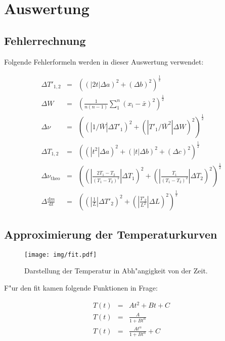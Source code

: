 \clearpage
\section{Auswertung}

\subsection{Fehlerrechnung} %
\label{sub:fehlerrechnung}

Folgende Fehlerformeln werden in dieser Auswertung verwendet:

\begin{eqnarray}
	\Delta T'_\mathrm{1,2} &=& \left((|2t| \Delta a)^2 + (\Delta b)^2\right)^\frac{1}{2}\\
	\Delta W &=& \left(\frac{1}{n(n-1)}\sum_1^n (x_\mathrm{i}-\bar{x})^2\right)^\frac{1}{2}\\
	\Delta \nu &=& \left((|1/\bar{W}| \Delta T'_\mathrm{1})^2 + (|T'_\mathrm{1}/\bar{W}^2| \Delta W)^2\right)^\frac{1}{2}\\
	\Delta T_\mathrm{1,2} &=& \left((|t^2| \Delta a)^2 + (|t| \Delta b)^2 + (\Delta c)^2\right)^\frac{1}{2}\\
	\Delta \nu_\mathrm{theo} &=& \left(\left(|\frac{2T_\mathrm{1}-T_\mathrm{2}}{(T_\mathrm{1}-T_\mathrm{2})^2}| \Delta T_\mathrm{1}\right)^2 + \left(|\frac{T_\mathrm{1}}{(T_\mathrm{1}-T_\mathrm{2})^2}| \Delta T_\mathrm{2}\right)^2\right)^\frac{1}{2}\\
	\Delta \frac{\mathrm{d}m}{\mathrm{d}t} &=& \left(\left(|\frac{1}{L}|\Delta T'_\mathrm{2}\right)^2 + \left(|\frac{T'_\mathrm{2}}{L^2}| \Delta L \right)^2\right)^\frac{1}{2}	
\end{eqnarray}

\subsection{Approximierung der Temperaturkurven} %
\label{sub:approximieren_der_temperaturkurven}



\begin{figure}[!h]
	\centering
	\texttt{[image: img/fit.pdf]}
	\caption{Darstellung der Temperatur in Abh"angigkeit von der Zeit.}
	\label{fit}
\end{figure}

F"ur den fit kamen folgende Funktionen in Frage:

\begin{eqnarray}
T(t) &=& A t^2 + B t + C \label{T11}\\
T(t) &=& \frac{A}{1+B t^\alpha}\\
T(t) &=& \frac{A t^\alpha}{1 + B t^\alpha} + C
\end{eqnarray}

